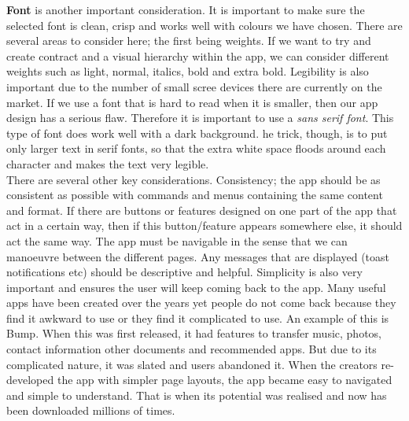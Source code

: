 \textbf{Font} is another important consideration.  It is important to make sure the selected font is clean, crisp and works well with colours we have chosen.  There are several areas to consider here; the first being weights.  If we want to try and create contract and a visual hierarchy within the app, we can consider different weights such as light, normal, italics, bold and extra bold.  Legibility is also important due to the number of small scree devices there are currently on the market.  If we use a font that is hard to read when it is smaller, then our app design has a serious flaw.  Therefore it is important to use a \emph{sans serif font}.  This type of font does work well with a dark background.  
he trick, though, is to put only larger text in serif fonts, so that the extra white space floods around each character and makes the text very legible.  \\
There are several other key considerations.  Consistency; the app should be as consistent as possible with commands and menus containing the same content and format.  If there are buttons or features designed on one part of the app that act in a certain way, then if this button/feature appears somewhere else, it should act the same way.  The app must be navigable in the sense that we can manoeuvre between the different pages.  Any messages that are displayed (toast notifications etc) should be descriptive and helpful.  Simplicity is also very important and ensures the user will keep coming back to the app.  Many useful apps have been created over the years yet people do not come back because they find it awkward to use or they find it complicated to use.  An example of this is Bump.  When this was first released, it had features to transfer music, photos, contact information other documents and recommended apps.  But due to its complicated nature, it was slated and users abandoned it.  When the creators re-developed the app with simpler page layouts, the app became easy to navigated and simple to understand.  That is when its potential was realised and now has been downloaded millions of times.  

